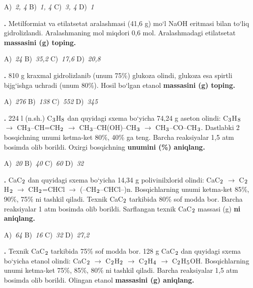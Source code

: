 \documentclass[11pt,a4paper]{article}
\renewcommand{\textsubscript}[1]{\ensuremath{_{\text{\fontsize{8}{8}\selectfont #1}}}}
\newcommand{\qn}[1]{\textbf{\fontsize{11.5}{13}\selectfont #1}}
\newcommand{\qsep}{\par\vspace{13pt}}
\begin{document}
\begin{multicols}{2}
\noindent A)~\textsl{2, 4} \hfill B)~\textsl{1, 4} \hfill C)~\textsl{3, 4} \hfill D)~\textsl{1}\par
\qsep
\noindent\qn{23.} Metilformiat va etilatsetat aralashmasi (41,6 g) mo`l NaOH eritmasi bilan to`liq gidrolizlandi. Aralashmaning mol miqdori 0,6 mol. Aralashmadagi etilatsetat \textbf{massasini (g) toping.}

\noindent A)~\textsl{24} \hfill B)~\textsl{35,2} \hfill C)~\textsl{17,6} \hfill D)~\textsl{20,8}\par
\qsep
\noindent\qn{24.} 810 g kraxmal gidrolizlanib (unum 75\%) glukoza olindi, glukoza esa spirtli bijg`ishga uchradi (unum 80\%). Hosil bo`lgan etanol \textbf{massasini (g) toping.}

\noindent A)~\textsl{276} \hfill B)~\textsl{138} \hfill C)~\textsl{552} \hfill D)~\textsl{345}\par
\qsep
\noindent\qn{25.} 224 l (n.sh.) C\textsubscript{3}H\textsubscript{8} dan quyidagi sxema bo`yicha 74,24 g aseton olindi: C\textsubscript{3}H\textsubscript{8} $\to$ CH\textsubscript{3}--CH=CH\textsubscript{2} $\to$ CH\textsubscript{3}--CH(OH)--CH\textsubscript{3} $\to$ CH\textsubscript{3}--CO--CH\textsubscript{3}. Dastlabki 2 bosqichning unumi ketma-ket 80\%, 40\% ga teng. Barcha reaksiyalar 1,5 atm bosimda olib borildi. Oxirgi bosqichning \textbf{unumini (\%) aniqlang.}

\noindent A)~\textsl{20} \hfill B)~\textsl{40} \hfill C)~\textsl{60} \hfill D)~\textsl{32}\par
\qsep
\noindent\qn{26.} CaC\textsubscript{2} dan quyidagi sxema bo`yicha 14,34 g polivinilxlorid olindi: CaC\textsubscript{2} $\to$ C\textsubscript{2}H\textsubscript{2} $\to$ CH\textsubscript{2}=CHCl $\to$ (--CH\textsubscript{2}--CHCl--)n. Bosqichlarning unumi ketma-ket 85\%, 90\%, 75\% ni tashkil qiladi. Texnik CaC\textsubscript{2} tarkibida 80\% sof modda bor. Barcha reaksiyalar 1 atm bosimda olib borildi. Sarflangan texnik CaC\textsubscript{2} massasi (g) \textbf{ni aniqlang.}

\noindent A)~\textsl{64} \hfill B)~\textsl{16} \hfill C)~\textsl{32} \hfill D)~\textsl{27,2}\par
\qsep
\noindent\qn{27.} Texnik CaC\textsubscript{2} tarkibida 75\% sof modda bor. 128 g CaC\textsubscript{2} dan quyidagi sxema bo`yicha etanol olindi: CaC\textsubscript{2} $\to$ C\textsubscript{2}H\textsubscript{2} $\to$ C\textsubscript{2}H\textsubscript{4} $\to$ C\textsubscript{2}H\textsubscript{5}OH. Bosqichlarning unumi ketma-ket 75\%, 85\%, 80\% ni tashkil qiladi. Barcha reaksiyalar 1,5 atm bosimda olib borildi. Olingan etanol \textbf{massasini (g) aniqlang.}


\end{multicols}
\end{document}
